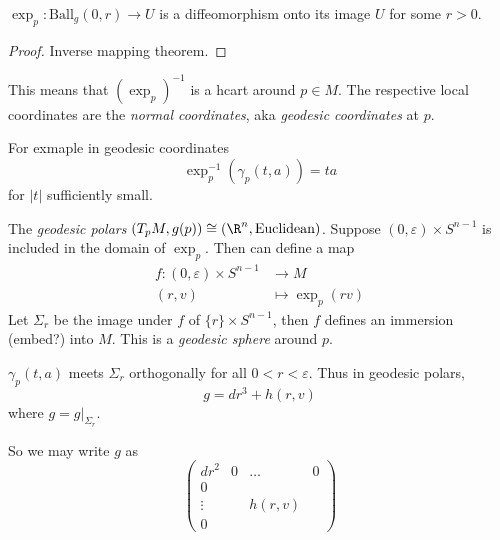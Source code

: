 \documentclass[a4paper]{article}
\begin{document}
\begin{corollary}
  \(\exp_p: \text{Ball}_g(0, r) \to U\) is a diffeomorphism onto its image \(U\) for some \(r > 0\).
\end{corollary}

\begin{proof}
  Inverse mapping theorem.
\end{proof}

This means that \((\exp_p)^{-1}\) is a hcart around \(p \in M\). The respective local coordinates are the \emph{normal coordinates}, aka \emph{geodesic coordinates} at \(p\).

For exmaple in geodesic coordinates
\[
  \exp_p^{-1} (\gamma_p(t, a)) = ta
\]
for \(|t|\) sufficiently small.

The \emph{geodesic polars} \((T_pM, g(p)) \cong (\R^n, \text{Euclidean})\). Suppose \((0, \varepsilon) \times S^{n - 1}\) is included in the domain of \(\exp_p\). Then can define a map
\begin{align*}
  f: (0, \varepsilon) \times S^{n - 1} &\to M \\
  (r, v) &\mapsto \exp_p(r v)
\end{align*}
Let \(\Sigma_r\) be the image under \(f\) of \(\{r\} \times S^{n - 1}\), then \(f\) defines an immersion (embed?) into \(M\). This is a \emph{geodesic sphere} around \(p\).

\begin{theorem}
  \(\gamma_p(t, a)\) meets \(\Sigma_r\) orthogonally for all \(0 < r < \varepsilon\). Thus in geodesic polars,
  \[
    g = dr^3 + h(r, v)
  \]
  where \(g = g|_{\Sigma_r}\).
\end{theorem}

So we may write \(g\) as
\[
  \begin{pmatrix}
    dr^2 & 0 & \dots & 0 \\
    0 \\
    \vdots & & h(r, v) \\
    0 
  \end{pmatrix}
\]
\end{document}

